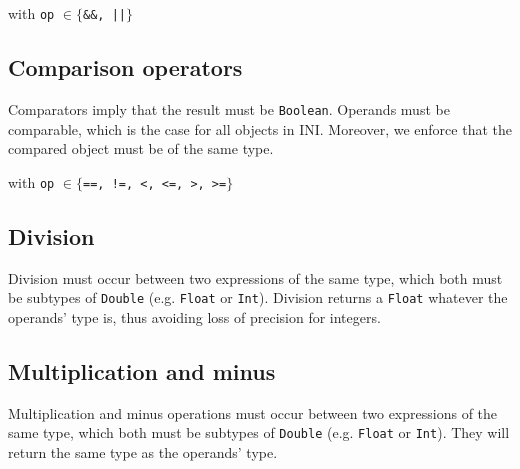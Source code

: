\documentclass[11pt]{report}
\begin{document}
\begin{center}
 
\DP
\end{center}
\begin{center}with  \texttt{op} $\in \{$\texttt{\&\&, ||}$\}$\end{center}

\subsection{Comparison operators}

Comparators imply that the result must be \texttt{Boolean}. Operands must be comparable, which is the case for all objects in INI. Moreover, we enforce that the compared object must be of the same type.

\begin{center}
 
\DP
\end{center}
\begin{center}with  \texttt{op} $\in \{$\texttt{==, !=, <, <=, >, >=}$\}$\end{center}

\subsection{Division}

Division must occur between two expressions of the same type, which both must be subtypes of \texttt{Double} (e.g. \texttt{Float} or \texttt{Int}). Division returns a \texttt{Float} whatever the operands' type is, thus avoiding loss of precision for integers.

\begin{center}
 
\DP
\end{center}

\subsection{Multiplication and minus}

Multiplication and minus operations must occur between two expressions of the same type, which both must be subtypes of \texttt{Double} (e.g. \texttt{Float} or \texttt{Int}). They will return the same type as the operands' type.
\end{document}
